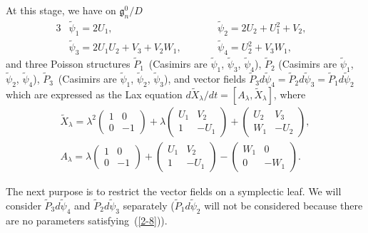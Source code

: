\documentclass[pdftex]{sigma}
\numberwithin{equation}{section}
\begin{document}
At this stage, we have on $\mathfrak{g}^0_n/D$
\begin{alignat*}{3}
& \widetilde{\psi}_1 = 2U_1, \qquad && \widetilde{\psi}_2 = 2U_2+U_1^2+V_2, & \\
& \widetilde{\psi}_3 = 2U_1U_2 + V_3 + V_2W_1, \qquad && \widetilde{\psi}_4 = U_2^2 + V_3W_1,&
\end{alignat*}
and three Poisson structures $\widetilde{P}_1$~(Casimirs are $\widetilde{\psi}_1$, $\widetilde{\psi}_3$, $\widetilde{\psi}_4$),
$\widetilde{P}_2$ (Casimirs are $\widetilde{\psi}_1$, $\widetilde{\psi}_2$, $\widetilde{\psi}_4$), $\widetilde{P}_3$~(Casimirs are $\widetilde{\psi}_1$, $\widetilde{\psi}_2$, $\widetilde{\psi}_3$), and vector f\/ields $\widetilde{P}_3d\widetilde{\psi}_4 = \widetilde{P}_2 d\widetilde{\psi}_3 = \widetilde{P}_1d\widetilde{\psi}_2$ which are expressed as the Lax equation $d\widetilde{X}_\lambda /dt = [A_\lambda, \widetilde{X}_\lambda ]$, where
\begin{gather*}
\widetilde{X}_\lambda = \lambda ^2 \left(
\begin{matrix}
1 & 0 \\
0 & -1
\end{matrix}
\right) + \lambda \left(
\begin{matrix}
U_1 & V_2 \\
1 & -U_1
\end{matrix}
\right) + \left(
\begin{matrix}
U_2 & V_3 \\
W_1 & -U_2
\end{matrix}
\right), \\
A_\lambda = \lambda \left(
\begin{matrix}
1 & 0 \\
0 & -1
\end{matrix}
\right) + \left(
\begin{matrix}
U_1 & V_2 \\
1 & -U_1
\end{matrix}
\right) - \left(
\begin{matrix}
W_1 & 0 \\
0 & -W_1
\end{matrix}
\right).
\end{gather*}

The next purpose is to restrict the vector f\/ields on a symplectic leaf. We will consider $\widetilde{P}_3d\widetilde{\psi}_4$ and $\widetilde{P}_2 d\widetilde{\psi}_3$ separately ($\widetilde{P}_1d\widetilde{\psi}_2$ will not be considered because there are no parameters satisfying~(\ref{2-8})).
\end{document}
